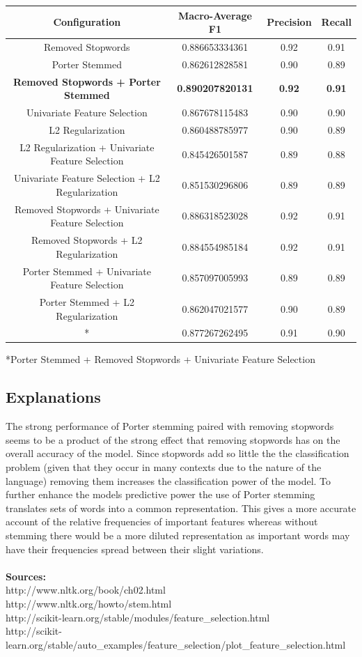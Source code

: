 \documentclass[11pt, oneside]{article}   	%
\begin{document}
\begin{center}
 \begin{tabular}{||c c c c||} 
 \hline
 Configuration & Macro-Average F1 & Precision & Recall \\ [0.5ex] 
 \hline\hline
Removed Stopwords & 0.886653334361 & 0.92 & 0.91 \\
Porter Stemmed & 0.862612828581 & 0.90 & 0.89 \\ 
\textbf{Removed Stopwords + Porter Stemmed} & \textbf{0.890207820131} & \textbf{0.92} & \textbf{0.91} \\
Univariate Feature Selection  & 0.867678115483 & 0.90 & 0.90 \\ 
L2 Regularization & 0.860488785977 & 0.90 & 0.89 \\
L2 Regularization + Univariate Feature Selection  & 0.845426501587 & 0.89 & 0.88 \\ 
Univariate Feature Selection + L2 Regularization & 0.851530296806 & 0.89 & 0.89 \\
Removed Stopwords + Univariate Feature Selection & 0.886318523028 & 0.92 & 0.91 \\ 
 Removed Stopwords + L2 Regularization & 0.884554985184 & 0.92 & 0.91 \\
Porter Stemmed + Univariate Feature Selection & 0.857097005993 & 0.89 & 0.89 \\
Porter Stemmed + L2 Regularization & 0.862047021577 & 0.90 & 0.89 \\ 
* & 0.877267262495 & 0.91 & 0.90 \\ [1ex] 
 \hline
\end{tabular}
\end{center}

*Porter Stemmed + Removed Stopwords + Univariate Feature Selection

\newpage
\subsection{Explanations}
The strong performance of Porter stemming paired with removing stopwords seems to be a product of the strong effect that removing stopwords has on the overall accuracy of the model.  Since stopwords add so little the the classification problem (given that they occur in many contexts due to the nature of the language) removing them increases the classification power of the model.  To further enhance the models predictive power the use of Porter stemming translates sets of words into a common representation.  This gives a more accurate account of the relative frequencies of important features whereas without stemming there would be a more diluted representation as important words may have their frequencies spread between their slight variations.\\\\
\textbf{Sources:}\\
http://www.nltk.org/book/ch02.html\\
http://www.nltk.org/howto/stem.html\\
http://scikit-learn.org/stable/modules/feature\_selection.html\\
http://scikit-learn.org/stable/auto\_examples/feature\_selection/plot\_feature\_selection.html
\end{document}
